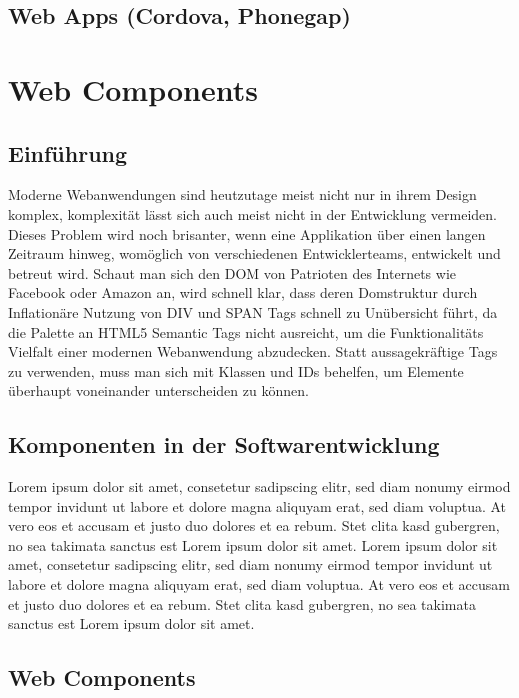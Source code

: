 \newpage


\subsection{Web Apps (Cordova, Phonegap)}





\section{Web Components}


\subsection{Einführung}

Moderne Webanwendungen sind heutzutage meist nicht nur in ihrem Design komplex, komplexität lässt sich auch meist nicht in der Entwicklung
vermeiden. Dieses Problem wird noch brisanter, wenn eine Applikation über einen langen Zeitraum hinweg,
womöglich von verschiedenen Entwicklerteams, entwickelt und betreut wird. Schaut man sich den DOM von Patrioten des Internets wie Facebook oder Amazon an,
wird schnell klar, dass deren Domstruktur durch Inflationäre Nutzung von DIV und SPAN Tags schnell zu Unübersicht führt,
da die Palette an HTML5 Semantic Tags nicht ausreicht, um die Funktionalitäts Vielfalt einer modernen Webanwendung abzudecken.
Statt aussagekräftige Tags zu verwenden, muss man sich mit Klassen und IDs behelfen, um Elemente überhaupt voneinander unterscheiden zu können.
\cite{sitepoint-introduction-to-webcomponents}

\subsection{Komponenten in der Softwarentwicklung}
Lorem ipsum dolor sit amet, consetetur sadipscing elitr, sed diam nonumy eirmod tempor invidunt ut labore et dolore magna aliquyam erat, sed diam voluptua. At vero eos et accusam et justo duo dolores et ea rebum. Stet clita kasd gubergren, no sea takimata sanctus est Lorem ipsum dolor sit amet. Lorem ipsum dolor sit amet, consetetur sadipscing elitr, sed diam nonumy eirmod tempor invidunt ut labore et dolore magna aliquyam erat, sed diam voluptua. At vero eos et accusam et justo duo dolores et ea rebum. Stet clita kasd gubergren, no sea takimata sanctus est Lorem ipsum dolor sit amet.



\subsection{Web Components}

